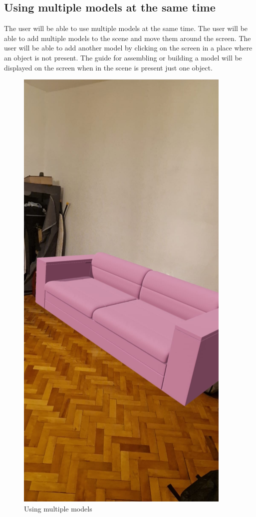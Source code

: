 \subsection{Using multiple models at the same time}
The user will be able to use multiple models at the same time. The user will be able to add multiple models to the scene and move them around the screen. The user will be able to add another model by clicking on the screen in a place where an object is not present. The guide for assembling or building a model will be displayed on the screen when in the scene is present just one object.
\begin{figure}[h!]
    \begin{center}
        \includegraphics[scale=0.5]{img/App_mock/iPhone 14 - 11.png}
        \caption{Using multiple models}
        \label{fig:using-multiple-models}
    \end{center}
\end{figure}
\pagebreak


